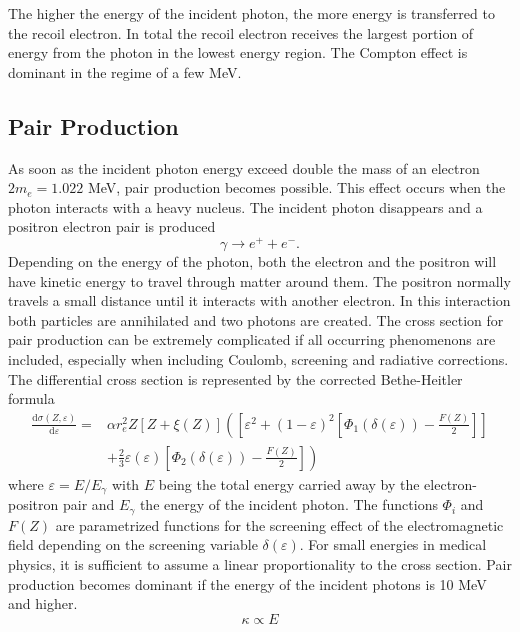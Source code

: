 The higher the energy of the incident photon, the more energy is transferred to the recoil electron. In total the recoil electron receives the largest portion of energy from the photon in the lowest energy region. The Compton effect is dominant in the regime of a few MeV.

\subsection{Pair Production}
As soon as the incident photon energy exceed double the mass of an electron $2m_e = 1.022$ MeV, pair production becomes possible. This effect occurs when the photon interacts with a heavy nucleus. The incident photon disappears and a positron electron pair is produced
\begin{equation}
\gamma \rightarrow e^+ + e^-.
\end{equation}
Depending on the energy of the photon, both the electron and the positron will have kinetic energy to travel through matter around them. The positron normally travels a small distance until it interacts with another electron. In this interaction both particles are annihilated and two photons are created. The cross section for pair production can be extremely complicated if all occurring phenomenons are included, especially when including Coulomb, screening and radiative corrections. The differential cross section is represented by the corrected Bethe-Heitler formula
\begin{equation}
\begin{split}
\frac{\mathrm{d}\sigma(Z,\varepsilon)}{\mathrm{d}\varepsilon} = & \alpha r_e^2 Z \left[ Z + \xi(Z) \right] \left( \left[ \varepsilon^2 + \left(1 - \varepsilon \right)^2 \left[ \Phi_1(\delta(\varepsilon)) - \frac{F(Z)}{2}\right] \right]\right.  \\
& \left.+ \frac{2}{3} \varepsilon \left(\varepsilon\right) \left[\Phi_2(\delta(\varepsilon)) - \frac{F(Z)}{2} \right] \right)
\end{split}
\end{equation}
where $\varepsilon=E/E_\gamma$ with $E$ being the total energy carried away by the electron-positron pair and $E_\gamma$ the energy of the incident photon. The functions $\Phi_i$ and $F(Z)$ are parametrized functions for the screening effect of the electromagnetic field depending on the screening variable $\delta(\varepsilon)$. For small energies in medical physics, it is sufficient to assume a linear proportionality to the cross section. Pair production becomes dominant if the energy of the incident photons is 10 MeV and higher.
\begin{equation}
\kappa\propto E
\end{equation}
